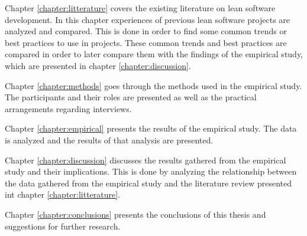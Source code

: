 Chapter \ref{chapter:litterature} covers the existing literature on lean software development. In this chapter experiences of previous lean software projects are analyzed and compared. This is done in order to find some common trends or best practices to use in projects. These common trends and best practices are compared in order to later compare them with the findings of the empirical study, which are presented in chapter \ref{chapter:discussion}.

Chapter \ref{chapter:methods} goes through the methods used in the empirical study. The participants and their roles are presented as well as the practical arrangements regarding interviews.

Chapter \ref{chapter:empirical} presents the results of the empirical study. The data is analyzed and the results of that analysis are presented.

Chapter \ref{chapter:discussion} discusses the results gathered from the empirical study and their implications. This is done by analyzing the relationship between the data gathered from the empirical study and the literature review presented int chapter \ref{chapter:litterature}.

Chapter \ref{chapter:conclusions} presents the conclusions of this thesis and suggestions for further research.
